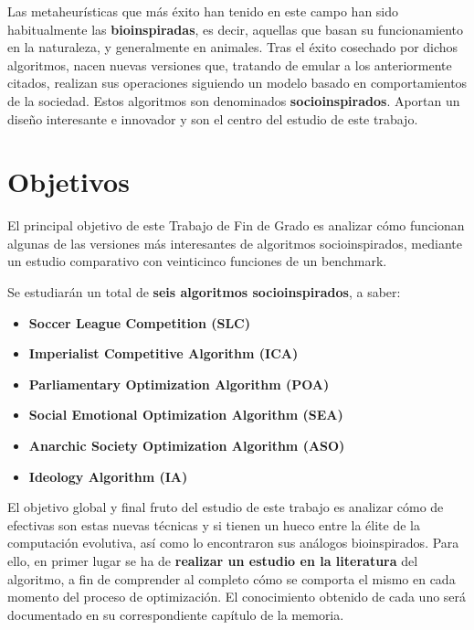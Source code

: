 Las metaheurísticas que más éxito han tenido en este campo han sido habitualmente las \textbf{bioinspiradas}, es decir, aquellas que basan su funcionamiento en la naturaleza, y generalmente en animales. Tras el éxito cosechado por dichos algoritmos, nacen nuevas versiones que, tratando de emular a los anteriormente citados, realizan sus operaciones siguiendo un modelo basado en comportamientos de la sociedad. Estos algoritmos son denominados \textbf{socioinspirados}. Aportan un diseño interesante e innovador y son el centro del estudio de este trabajo.

\section{Objetivos}

El principal objetivo de este Trabajo de Fin de Grado es analizar cómo funcionan algunas de las versiones más interesantes de algoritmos socioinspirados, mediante un estudio comparativo con veinticinco funciones de un benchmark. 

Se estudiarán un total de \textbf{seis algoritmos socioinspirados}, a saber:

\begin{itemize}
	\item \textbf{Soccer League Competition (SLC)} \cite{slc-article}
	\item \textbf{Imperialist Competitive Algorithm (ICA)} \cite{ica-conference}
	\item \textbf{Parliamentary Optimization Algorithm (POA)} \cite{poa-article}
	\item \textbf{Social Emotional Optimization Algorithm (SEA)} \cite{sea-chapter}
	\item \textbf{Anarchic Society Optimization Algorithm (ASO)} \cite{aso-article} \cite{aso-chapter}
	\item \textbf{Ideology Algorithm (IA)} \cite{ia-article}
\end{itemize}

El objetivo global y final fruto del estudio de este trabajo es analizar cómo de efectivas son estas nuevas técnicas y si tienen un hueco entre la élite de la computación evolutiva, así como lo encontraron sus análogos bioinspirados. Para ello, en primer lugar se ha de \textbf{realizar un estudio en la literatura} del algoritmo, a fin de comprender al completo cómo se comporta el mismo en cada momento del proceso de optimización. El conocimiento obtenido de cada uno será documentado en su correspondiente capítulo de la memoria.

